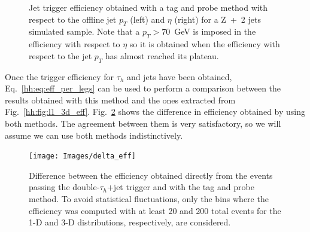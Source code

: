 \documentclass[../main.tex]{subfiles}
\begin{document}
\begin{figure}[h!]
\begin{center}
\end{center}
\caption{Jet trigger efficiency obtained with a tag and probe method with respect to the offline jet $p_T$ (left) and $\eta$ (right) for a Z~+~2 jets simulated sample. Note that a $p_T>70$~GeV is imposed in the efficiency with respect to $\eta$ so it is obtained when the efficiency with respect to the jet $p_T$ has almost reached its plateau. }
\label{hh:fig:l1_eff_jetleg}
\end{figure}

Once the trigger efficiency for $\tau_h$ and jets have been obtained, Eq.~\eqref{hh:eq:eff_per_legs} can be used to perform a comparison between the results obtained with this method and the ones extracted from Fig.~\ref{hh:fig:l1_3d_eff}. Fig.~\ref{hh:fig:l1_delta_eff} shows the difference in efficiency obtained by using both methods. The agreement between them is very satisfactory, so we will assume we can use both methods indistinctively.

\begin{figure}[h!]
\begin{center}
\texttt{[image: Images/delta\_eff]}
\end{center}
\caption{Difference between the efficiency obtained directly from the events passing the double-$\tau_h$+jet trigger and with the tag and probe method. To avoid statistical fluctuations, only the bins where the efficiency was computed with at least 20 and 200 total events for the 1-D and 3-D distributions, respectively, are considered.}
\label{hh:fig:l1_delta_eff}
\end{figure}
\end{document}
